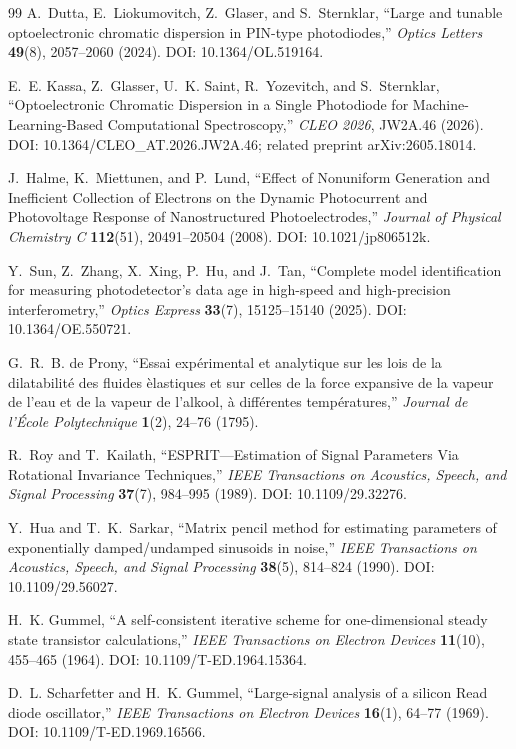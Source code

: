 \documentclass[11pt]{article}
\begin{document}
\begin{thebibliography}{99}
A.~Dutta, E.~Liokumovitch, Z.~Glaser, and S.~Sternklar, ``Large and tunable optoelectronic chromatic dispersion in PIN-type photodiodes,'' \emph{Optics Letters} \textbf{49}(8), 2057--2060 (2024). DOI: 10.1364/OL.519164.

E.~E. Kassa, Z.~Glasser, U.~K. Saint, R.~Yozevitch, and S.~Sternklar, ``Optoelectronic Chromatic Dispersion in a Single Photodiode for Machine-Learning-Based Computational Spectroscopy,'' \emph{CLEO 2026}, JW2A.46 (2026). DOI: 10.1364/CLEO\_AT.2026.JW2A.46; related preprint arXiv:2605.18014.

J.~Halme, K.~Miettunen, and P.~Lund, ``Effect of Nonuniform Generation and Inefficient Collection of Electrons on the Dynamic Photocurrent and Photovoltage Response of Nanostructured Photoelectrodes,'' \emph{Journal of Physical Chemistry C} \textbf{112}(51), 20491--20504 (2008). DOI: 10.1021/jp806512k.

Y.~Sun, Z.~Zhang, X.~Xing, P.~Hu, and J.~Tan, ``Complete model identification for measuring photodetector's data age in high-speed and high-precision interferometry,'' \emph{Optics Express} \textbf{33}(7), 15125--15140 (2025). DOI: 10.1364/OE.550721.

G.~R.~B. de Prony, ``Essai exp\'erimental et analytique sur les lois de la dilatabilit\'e des fluides \`elastiques et sur celles de la force expansive de la vapeur de l'eau et de la vapeur de l'alkool, \`a diff\'erentes temp\'eratures,'' \emph{Journal de l'\'Ecole Polytechnique} \textbf{1}(2), 24--76 (1795).

R.~Roy and T.~Kailath, ``ESPRIT---Estimation of Signal Parameters Via Rotational Invariance Techniques,'' \emph{IEEE Transactions on Acoustics, Speech, and Signal Processing} \textbf{37}(7), 984--995 (1989). DOI: 10.1109/29.32276.

Y.~Hua and T.~K.~Sarkar, ``Matrix pencil method for estimating parameters of exponentially damped/undamped sinusoids in noise,'' \emph{IEEE Transactions on Acoustics, Speech, and Signal Processing} \textbf{38}(5), 814--824 (1990). DOI: 10.1109/29.56027.

H.~K. Gummel, ``A self-consistent iterative scheme for one-dimensional steady state transistor calculations,'' \emph{IEEE Transactions on Electron Devices} \textbf{11}(10), 455--465 (1964). DOI: 10.1109/T-ED.1964.15364.

D.~L. Scharfetter and H.~K. Gummel, ``Large-signal analysis of a silicon Read diode oscillator,'' \emph{IEEE Transactions on Electron Devices} \textbf{16}(1), 64--77 (1969). DOI: 10.1109/T-ED.1969.16566.

\end{thebibliography}
\end{document}
